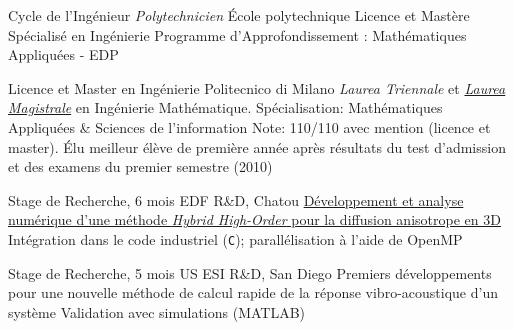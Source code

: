 \documentclass[french]{RMcv}
\begin{document}


%
%
        {Cycle de l'Ing\'enieur \textit{Polytechnicien}}%
        {\'Ecole polytechnique}%
        {Licence et Mastère Spécialisé en Ing\'enierie}%
        {Programme d'Approfondissement : Math\'ematiques Appliqu\'ees - EDP}


%
%
        {Licence et Master en Ing\'enierie}%
        {Politecnico di Milano}%
        {\emph{Laurea Triennale} et \href{https://www.politesi.polimi.it/handle/10589/133692}{\emph{Laurea Magistrale}} en Ing\'enierie Math\'ematique. Sp\'ecialisation: Math\'ematiques Appliqu\'ees \& Sciences de l'information}%
        {Note: 110/110 avec mention (licence et master). \'Elu meilleur \'el\`eve de premi\`ere ann\'ee apr\`es r\'esultats du test d'admission et des examens du premier semestre (2010)}

\vspace{8pt}


%
%
        {Stage de Recherche, 6 mois}%
        {EDF R\&D, Chatou}%
        {\href{https://www.politesi.polimi.it/handle/10589/133692}{D\'eveloppement et analyse num\'erique d'une m\'ethode \emph{Hybrid High-Order} pour la diffusion anisotrope en 3D}}%
        {Int\'egration dans le code industriel \cs{} (\texttt{C}); parall\'elisation \`a l'aide de OpenMP}


%
%
        {Stage de Recherche, 5 mois}%
        {US ESI R\&D, San Diego}%
        {Premiers d\'eveloppements pour une nouvelle m\'ethode de calcul rapide de la r\'eponse vibro-acoustique d'un syst\`eme}%
        {Validation avec simulations (MATLAB)}

\end{document}
